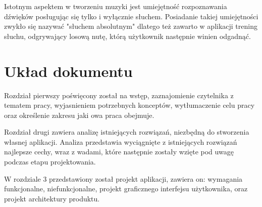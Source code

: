 Istotnym aspektem w tworzeniu muzyki jest umiejętność rozpoznawania dźwięków posługując się tylko i wyłącznie słuchem. Posiadanie takiej umiejętności zwykło się nazywać "słuchem absolutnym" dlatego też zawarto w aplikacji trening słuchu, odgrywający losową nutę, którą użytkownik następnie winien odgadnąć.  


\section{Układ dokumentu}
Rozdział pierwszy poświęcony został na wstęp, zaznajomienie czytelnika z tematem pracy, wyjasnieniem potrzebnych konceptów, wytłumaczenie celu pracy oraz określenie zakresu jaki owa praca obejmuje. 

Rozdział drugi zawiera analizę istniejących rozwiązań, niezbędną do stworzenia własnej aplikacji. Analiza przedstawia wyciągnięte z istniejących rozwiązań najlepsze cechy, wraz z wadami, które następnie zostały wzięte pod uwagę podczas etapu projektowania.

W rozdziale 3 przedstawiony został projekt aplikacji, zawiera on: wymagania funkcjonalne, niefunkcjonalne, projekt graficznego interfejsu użytkownika, oraz projekt architektury produktu.

